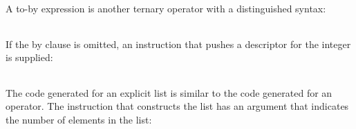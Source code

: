 A to-by expression is another ternary operator with a distinguished syntax:

\begin{center}
\tablelasttail{\hline}
\begin{supertabular}{|m{1.9073598in}|m{2.75596in}|}

\end{supertabular}
\end{center}

If the by clause is omitted, an instruction that pushes a descriptor
for the integer is supplied:

\begin{center}
\tablelasttail{\hline}
\begin{supertabular}{|m{1.9073598in}|m{2.75596in}|}

\end{supertabular}
\end{center}

The code generated for an explicit list is similar to the code
generated for an operator. The instruction that constructs the list
has an argument that indicates the number of elements in the list:

\begin{center}
\tablelasttail{\hline}
\begin{supertabular}{|m{1.9073598in}|m{2.75596in}|}

\end{supertabular}
\end{center}



